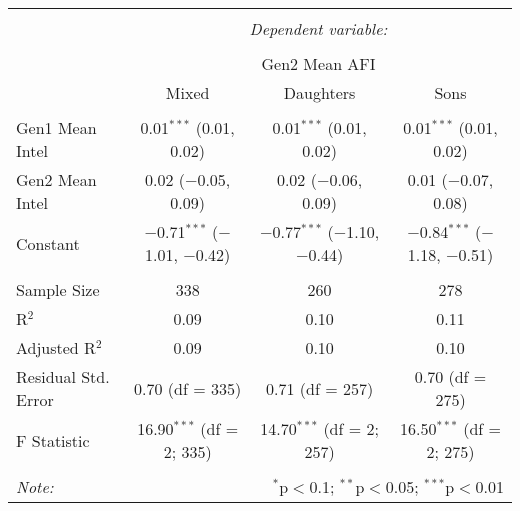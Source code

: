 
\begingroup 
\small 
\begin{tabular}{@{\extracolsep{1pt}}lccc} 
\\[-1.8ex]\hline 
\hline \\[-1.8ex] 
 & \multicolumn{3}{c}{\textit{Dependent variable:}} \\ 
\cline{2-4} 
\\[-1.8ex] & \multicolumn{3}{c}{Gen2 Mean AFI} \\ 
 & Mixed & Daughters & Sons \\ 
\hline \\[-1.8ex] 
 Gen1 Mean Intel & 0.01$^{***}$ (0.01, 0.02) & 0.01$^{***}$ (0.01, 0.02) & 0.01$^{***}$ (0.01, 0.02) \\ 
  Gen2 Mean Intel & 0.02 ($-$0.05, 0.09) & 0.02 ($-$0.06, 0.09) & 0.01 ($-$0.07, 0.08) \\ 
  Constant & $-$0.71$^{***}$ ($-$1.01, $-$0.42) & $-$0.77$^{***}$ ($-$1.10, $-$0.44) & $-$0.84$^{***}$ ($-$1.18, $-$0.51) \\ 
 \hline \\[-1.8ex] 
Sample Size & 338 & 260 & 278 \\ 
R$^{2}$ & 0.09 & 0.10 & 0.11 \\ 
Adjusted R$^{2}$ & 0.09 & 0.10 & 0.10 \\ 
Residual Std. Error & 0.70 (df = 335) & 0.71 (df = 257) & 0.70 (df = 275) \\ 
F Statistic & 16.90$^{***}$ (df = 2; 335) & 14.70$^{***}$ (df = 2; 257) & 16.50$^{***}$ (df = 2; 275) \\ 
\hline 
\hline \\[-1.8ex] 
\textit{Note:}  & \multicolumn{3}{r}{$^{*}$p$<$0.1; $^{**}$p$<$0.05; $^{***}$p$<$0.01} \\ 
\end{tabular} 
\endgroup 
